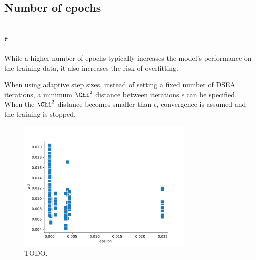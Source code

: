 \subsection{Number of epochs}
\blindtext[4]


\subsection{$\epsilon$}
While a higher number of epochs typically increases the model's performance on the training data,
it also increases the risk of overfitting.

When using adaptive step sizes,
instead of setting a fixed number of DSEA iterations,
a minimum $\Chi^2$ distance between iterations $\epsilon$
can be specified.
When the $\Chi^2$ distance becomes smaller than $\epsilon$,
convergence is assumed and the training is stopped.

\begin{figure}
  \centering
  \includegraphics[width=0.75\textwidth]{content/plots/hyperparam/epsilon_vs_wd_scatterplot.pdf}
  \caption{TODO.}
  \label{fig:hyperparameter:epsilon}
\end{figure}
